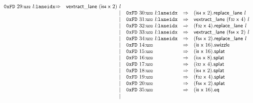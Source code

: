 $$\begin{array}{@{}l@{}rrlll@{}l@{}}
\mathtt{0xFD}~29{:}{\mathtt{u{\scriptstyle32}}}~{\mathit{l}}{:}{\mathtt{laneidx}} &\Rightarrow& \mathsf{vextract\_lane}~(\mathsf{i{\scriptstyle64}}~\mathsf{x}~2)~{\mathit{l}} \\ &&|&
\mathtt{0xFD}~30{:}{\mathtt{u{\scriptstyle32}}}~{\mathit{l}}{:}{\mathtt{laneidx}} &\Rightarrow& (\mathsf{i{\scriptstyle64}}~\mathsf{x}~2).\mathsf{replace\_lane}~{\mathit{l}} \\ &&|&
\mathtt{0xFD}~31{:}{\mathtt{u{\scriptstyle32}}}~{\mathit{l}}{:}{\mathtt{laneidx}} &\Rightarrow& \mathsf{vextract\_lane}~(\mathsf{f{\scriptstyle32}}~\mathsf{x}~4)~{\mathit{l}} \\ &&|&
\mathtt{0xFD}~32{:}{\mathtt{u{\scriptstyle32}}}~{\mathit{l}}{:}{\mathtt{laneidx}} &\Rightarrow& (\mathsf{f{\scriptstyle32}}~\mathsf{x}~4).\mathsf{replace\_lane}~{\mathit{l}} \\ &&|&
\mathtt{0xFD}~33{:}{\mathtt{u{\scriptstyle32}}}~{\mathit{l}}{:}{\mathtt{laneidx}} &\Rightarrow& \mathsf{vextract\_lane}~(\mathsf{f{\scriptstyle64}}~\mathsf{x}~2)~{\mathit{l}} \\ &&|&
\mathtt{0xFD}~34{:}{\mathtt{u{\scriptstyle32}}}~{\mathit{l}}{:}{\mathtt{laneidx}} &\Rightarrow& (\mathsf{f{\scriptstyle64}}~\mathsf{x}~2).\mathsf{replace\_lane}~{\mathit{l}} \\ &&|&
\mathtt{0xFD}~14{:}{\mathtt{u{\scriptstyle32}}} &\Rightarrow& (\mathsf{i{\scriptstyle8}}~\mathsf{x}~16).\mathsf{swizzle} \\ &&|&
\mathtt{0xFD}~15{:}{\mathtt{u{\scriptstyle32}}} &\Rightarrow& (\mathsf{i{\scriptstyle8}}~\mathsf{x}~16).\mathsf{splat} \\ &&|&
\mathtt{0xFD}~16{:}{\mathtt{u{\scriptstyle32}}} &\Rightarrow& (\mathsf{i{\scriptstyle16}}~\mathsf{x}~8).\mathsf{splat} \\ &&|&
\mathtt{0xFD}~17{:}{\mathtt{u{\scriptstyle32}}} &\Rightarrow& (\mathsf{i{\scriptstyle32}}~\mathsf{x}~4).\mathsf{splat} \\ &&|&
\mathtt{0xFD}~18{:}{\mathtt{u{\scriptstyle32}}} &\Rightarrow& (\mathsf{i{\scriptstyle64}}~\mathsf{x}~2).\mathsf{splat} \\ &&|&
\mathtt{0xFD}~19{:}{\mathtt{u{\scriptstyle32}}} &\Rightarrow& (\mathsf{f{\scriptstyle32}}~\mathsf{x}~4).\mathsf{splat} \\ &&|&
\mathtt{0xFD}~20{:}{\mathtt{u{\scriptstyle32}}} &\Rightarrow& (\mathsf{f{\scriptstyle64}}~\mathsf{x}~2).\mathsf{splat} \\ &&|&
\mathtt{0xFD}~35{:}{\mathtt{u{\scriptstyle32}}} &\Rightarrow& (\mathsf{i{\scriptstyle8}}~\mathsf{x}~16) . \mathsf{eq} \\ &&|&

\end{array}$$
